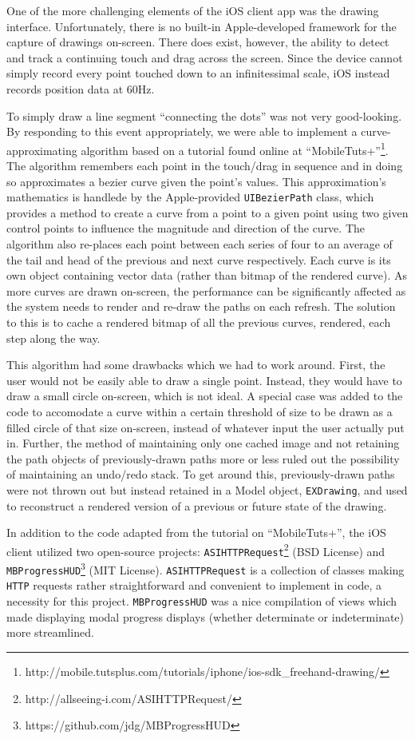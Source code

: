 \documentclass{acm_proc_article-sp}
\begin{document}
One of the more challenging elements of the iOS client app was the drawing interface. Unfortunately, there is no built-in Apple-developed framework for the capture of drawings on-screen. There does exist, however, the ability to detect and track a continuing touch and drag across the screen. Since the device cannot simply record every point touched down to an infinitessimal scale, iOS instead records position data at 60Hz.

To simply draw a line segment ``connecting the dots'' was not very good-looking. By responding to this event appropriately, we were able to implement a curve-approximating algorithm based on a tutorial found online at ``MobileTuts+''\footnote{http://mobile.tutsplus.com/tutorials/iphone/ios-sdk\_freehand-drawing/}. The algorithm remembers each point in the touch/drag in sequence and in doing so approximates a bezier curve given the point's values. This approximation's mathematics is handlede by the Apple-provided \texttt{UIBezierPath} class, which provides a method to create a curve from a point to a given point using two given control points to influence the magnitude and direction of the curve. The algorithm also re-places each point between each series of four to an average of the tail and head of the previous and next curve respectively. Each curve is its own object containing vector data (rather than bitmap of the rendered curve). As more curves are drawn on-screen, the performance can be significantly affected as the system needs to render and re-draw the paths on each refresh. The solution to this is to cache a rendered bitmap of all the previous curves, rendered, each step along the way. 

This algorithm had some drawbacks which we had to work around. First, the user would not be easily able to draw a single point. Instead, they would have to draw a small circle on-screen, which is not ideal. A special case was added to the code to accomodate a curve within a certain threshold of size to be drawn as a filled circle of that size on-screen, instead of whatever input the user actually put in. Further, the method of maintaining only one cached image and not retaining the path objects of previously-drawn paths more or less ruled out the possibility of maintaining an undo/redo stack. To get around this, previously-drawn paths were not thrown out but instead retained in a Model object, \texttt{EXDrawing}, and used to reconstruct a rendered version of a previous or future state of the drawing.

In addition to the code adapted from the tutorial on ``MobileTuts+'', the iOS client utilized two open-source projects: \texttt{ASIHTTPRequest}\footnote{http://allseeing-i.com/ASIHTTPRequest/} (BSD License) and \texttt{MBProgressHUD}\footnote{https://github.com/jdg/MBProgressHUD} (MIT License). \texttt{ASIHTTPRequest} is a collection of classes making \texttt{HTTP} requests rather straightforward and convenient to implement in code, a necessity for this project. \texttt{MBProgressHUD} was a nice compilation of views which made displaying modal progress displays (whether determinate or indeterminate) more streamlined.
\end{document}
